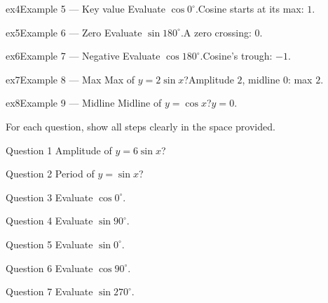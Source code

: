 \documentclass[11pt]{article}
\begin{document}
\begin{example}{ex4}{Example 5 --- Key value}
Evaluate $\cos0^\circ$.\soln Cosine starts at its max: $1$.
\end{example}

\begin{example}{ex5}{Example 6 --- Zero}
Evaluate $\sin180^\circ$.\soln A zero crossing: $0$.
\end{example}

\begin{example}{ex6}{Example 7 --- Negative}
Evaluate $\cos180^\circ$.\soln Cosine's trough: $-1$.
\end{example}

\begin{example}{ex7}{Example 8 --- Max}
Max of $y=2\sin x$?\soln Amplitude $2$, midline $0$: max $2$.
\end{example}

\begin{example}{ex8}{Example 9 --- Midline}
Midline of $y=\cos x$?\soln $y=0$.
\end{example}

\clearpage
{}
For each question, show all steps clearly in the space provided.

\begin{qbox}{Question 1}
Amplitude of $y=6\sin x$?\workspace{2.4cm}
\end{qbox}

\begin{qbox}{Question 2}
Period of $y=\sin x$?\workspace{2.4cm}
\end{qbox}

\begin{qbox}{Question 3}
Evaluate $\cos0^\circ$.\workspace{2.4cm}
\end{qbox}

\begin{qbox}{Question 4}
Evaluate $\sin90^\circ$.\workspace{2.4cm}
\end{qbox}

\begin{qbox}{Question 5}
Evaluate $\sin0^\circ$.\workspace{2.4cm}
\end{qbox}

\begin{qbox}{Question 6}
Evaluate $\cos90^\circ$.\workspace{2.4cm}
\end{qbox}

\begin{qbox}{Question 7}
Evaluate $\sin270^\circ$.\workspace{2.4cm}
\end{qbox}
\end{document}

